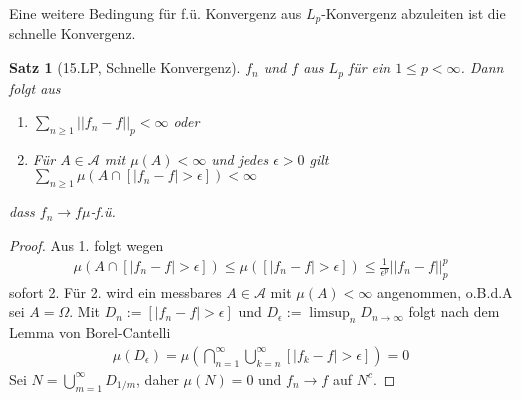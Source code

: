 \documentclass[]{article}
\newtheorem{theorem}{Satz}
\begin{document}
Eine weitere Bedingung für f.ü. Konvergenz aus $L_p$-Konvergenz abzuleiten ist die schnelle Konvergenz.

\begin{theorem}[15.LP, Schnelle Konvergenz]
	$f_n$ und $f$ aus $L_p$ für ein $1 \leq p < \infty$. Dann folgt aus
	\begin{enumerate}
		\item $\sum_{n\geq 1} ||f_n - f||_p < \infty$ oder
		\item Für $A \in \mathcal{A}$ mit $\mu(A) < \infty$ und jedes $\epsilon > 0$ gilt $\sum_{n\geq 1} \mu(A \cap [|f_n-f| > \epsilon]) < \infty$
	\end{enumerate}
	dass $f_n \rightarrow f \mu$-f.ü.
\end{theorem}

\begin{proof}
	Aus 1. folgt wegen
	\begin{align*}
		\mu(A \cap [|f_n - f| > \epsilon]) \leq \mu([|f_n - f| > \epsilon]) \leq \frac{1}{\epsilon^p} ||f_n - f||^p_p
	\end{align*}
	sofort 2. Für 2. wird ein messbares $A \in \mathcal{A}$ mit $\mu(A) < \infty$ angenommen, o.B.d.A sei $A = \Omega$. Mit $D_n := [|f_n - f| > \epsilon]$ und $D_\epsilon := \limsup_{n}D_{n\rightarrow\infty}$ folgt nach dem Lemma von Borel-Cantelli
	\begin{align*}
		\mu(D_\epsilon) = \mu(\bigcap_{n=1}^{\infty} \bigcup_{k=n}^{\infty}[|f_k - f| > \epsilon]) = 0
	\end{align*}
	Sei $N = \bigcup_{m=1}^\infty D_{1/m}$, daher $\mu(N) = 0$ und $f_n \rightarrow f$ auf $N^c$.
\end{proof}
\end{document}

